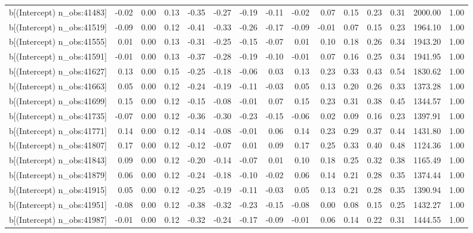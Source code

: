 \begin{table}[ht]
\begin{tabular}{rrrrrrrrrrrrrrr}
  b[(Intercept) n\_obs:41483] & -0.02 & 0.00 & 0.13 & -0.35 & -0.27 & -0.19 & -0.11 & -0.02 & 0.07 & 0.15 & 0.23 & 0.31 & 2000.00 & 1.00 \\ 
  b[(Intercept) n\_obs:41519] & -0.09 & 0.00 & 0.12 & -0.41 & -0.33 & -0.26 & -0.17 & -0.09 & -0.01 & 0.07 & 0.15 & 0.23 & 1964.10 & 1.00 \\ 
  b[(Intercept) n\_obs:41555] & 0.01 & 0.00 & 0.13 & -0.31 & -0.25 & -0.15 & -0.07 & 0.01 & 0.10 & 0.18 & 0.26 & 0.34 & 1943.20 & 1.00 \\ 
  b[(Intercept) n\_obs:41591] & -0.01 & 0.00 & 0.13 & -0.37 & -0.28 & -0.19 & -0.10 & -0.01 & 0.07 & 0.16 & 0.25 & 0.34 & 1941.95 & 1.00 \\ 
  b[(Intercept) n\_obs:41627] & 0.13 & 0.00 & 0.15 & -0.25 & -0.18 & -0.06 & 0.03 & 0.13 & 0.23 & 0.33 & 0.43 & 0.54 & 1830.62 & 1.00 \\ 
  b[(Intercept) n\_obs:41663] & 0.05 & 0.00 & 0.12 & -0.24 & -0.19 & -0.11 & -0.03 & 0.05 & 0.13 & 0.20 & 0.26 & 0.33 & 1373.28 & 1.00 \\ 
  b[(Intercept) n\_obs:41699] & 0.15 & 0.00 & 0.12 & -0.15 & -0.08 & -0.01 & 0.07 & 0.15 & 0.23 & 0.31 & 0.38 & 0.45 & 1344.57 & 1.00 \\ 
  b[(Intercept) n\_obs:41735] & -0.07 & 0.00 & 0.12 & -0.36 & -0.30 & -0.23 & -0.15 & -0.06 & 0.02 & 0.09 & 0.16 & 0.23 & 1397.91 & 1.00 \\ 
  b[(Intercept) n\_obs:41771] & 0.14 & 0.00 & 0.12 & -0.14 & -0.08 & -0.01 & 0.06 & 0.14 & 0.23 & 0.29 & 0.37 & 0.44 & 1431.80 & 1.00 \\ 
  b[(Intercept) n\_obs:41807] & 0.17 & 0.00 & 0.12 & -0.12 & -0.07 & 0.01 & 0.09 & 0.17 & 0.25 & 0.33 & 0.40 & 0.48 & 1124.36 & 1.00 \\ 
  b[(Intercept) n\_obs:41843] & 0.09 & 0.00 & 0.12 & -0.20 & -0.14 & -0.07 & 0.01 & 0.10 & 0.18 & 0.25 & 0.32 & 0.38 & 1165.49 & 1.00 \\ 
  b[(Intercept) n\_obs:41879] & 0.06 & 0.00 & 0.12 & -0.24 & -0.18 & -0.10 & -0.02 & 0.06 & 0.14 & 0.21 & 0.28 & 0.35 & 1374.44 & 1.00 \\ 
  b[(Intercept) n\_obs:41915] & 0.05 & 0.00 & 0.12 & -0.25 & -0.19 & -0.11 & -0.03 & 0.05 & 0.13 & 0.21 & 0.28 & 0.35 & 1390.94 & 1.00 \\ 
  b[(Intercept) n\_obs:41951] & -0.08 & 0.00 & 0.12 & -0.38 & -0.32 & -0.23 & -0.15 & -0.08 & 0.00 & 0.08 & 0.15 & 0.25 & 1432.27 & 1.00 \\ 
  b[(Intercept) n\_obs:41987] & -0.01 & 0.00 & 0.12 & -0.32 & -0.24 & -0.17 & -0.09 & -0.01 & 0.06 & 0.14 & 0.22 & 0.31 & 1444.55 & 1.00 \\ 

\end{tabular}
\end{table}
